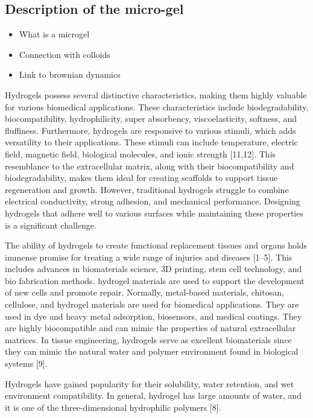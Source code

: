 \documentclass[../../main-notes.tex]{subfiles}
\begin{document}
\subsection{Description of the micro-gel}

\begin{itemize}
    \item What is a microgel
    \item Connection with colloids 
    \item Link to brownian dynamics
\end{itemize}


\citep{priyaComprehensiveReviewHydrogel2024}

Hydrogels possess several distinctive characteristics, making them highly valuable for various biomedical applications. 
These characteristics include biodegradability, biocompatibility, hydrophilicity, super absorbency, viscoelasticity, softness, and fluffiness. 
Furthermore, hydrogels are responsive to various stimuli, which adds versatility to their applications. 
These stimuli can include temperature, electric field, magnetic field, biological molecules, and ionic strength [11,12]. 
This resemblance to the extracellular matrix, along with their biocompatibility and biodegradability, makes them ideal for creating scaffolds to support tissue regeneration and growth. 
However, traditional hydrogels struggle to combine electrical conductivity, strong adhesion, and mechanical performance.
Designing hydrogels that adhere well to various surfaces while maintaining these properties is a significant challenge.


The ability of hydrogels to create functional replacement tissues and organs holds immense promise for treating a wide range of injuries and diseases [1–5]. 
This includes advances in biomaterials science, 3D printing, stem cell technology, and bio fabrication methods.
hydrogel materials are used to support the development of new cells and promote repair. 
Normally, metal-based materials, chitosan, cellulose, and hydrogel materials are used for biomedical applications.
They are used in dye and heavy metal adsorption, biosensors, and medical coatings. 
They are highly biocompatible and can mimic the properties of natural extracellular matrices. 
In tissue engineering, hydrogels serve as excellent biomaterials since they can mimic the natural water and polymer environment found in biological systems [9]. 

Hydrogels have gained popularity for their solubility, water retention, and wet environment compatibility. 
In general, hydrogel has large amounts of water, and it is one of the three-dimensional hydrophilic polymers [8]. 
\end{document}
